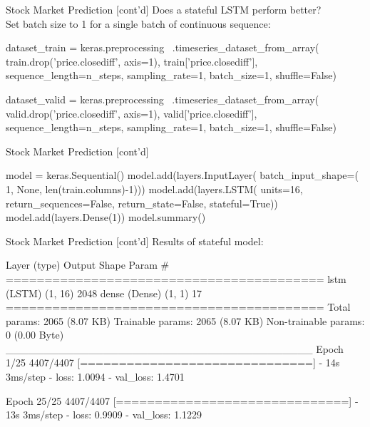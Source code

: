 \documentclass[ignorenonframetext,xcolor=x11names]{beamer}
\begin{document}
\begin{frame}[fragile]{Stock Market Prediction \small [cont'd]}
Does a stateful LSTM perform better? \\

Set batch size to 1 for a single batch of continuous sequence:
\begin{pythoncode}
dataset_train = keras.preprocessing \
    .timeseries_dataset_from_array(
        train.drop('price.closediff', axis=1),
        train['price.closediff'],
        sequence_length=n_steps,
        sampling_rate=1, batch_size=1, shuffle=False)
\end{pythoncode}

\begin{pythoncode}
dataset_valid = keras.preprocessing \
    .timeseries_dataset_from_array(
        valid.drop('price.closediff', axis=1),
        valid['price.closediff'],
        sequence_length=n_steps,
        sampling_rate=1, batch_size=1, shuffle=False)
\end{pythoncode}
\end{frame}

\begin{frame}[fragile]{Stock Market Prediction \small [cont'd]}
\begin{pythoncode}
model = keras.Sequential()
model.add(layers.InputLayer(
    batch_input_shape=(
        1, None, len(train.columns)-1)))
model.add(layers.LSTM(
    units=16,
    return_sequences=False,
    return_state=False,
    stateful=True))
model.add(layers.Dense(1))
model.summary()
\end{pythoncode}
\end{frame}

\begin{frame}[fragile]{Stock Market Prediction \small [cont'd]}
Results of stateful model:

\begin{textcode}
 Layer (type)    Output Shape    Param #   
=========================================
 lstm (LSTM)     (1, 16)         2048      
 dense (Dense)   (1, 1)          17        
=========================================
Total params: 2065 (8.07 KB)
Trainable params: 2065 (8.07 KB)
Non-trainable params: 0 (0.00 Byte)
_________________________________________
Epoch 1/25
4407/4407 [==============================] 
- 14s 3ms/step - loss: 1.0094 - val_loss: 1.4701

Epoch 25/25
4407/4407 [==============================] 
- 13s 3ms/step - loss: 0.9909 - val_loss: 1.1229
\end{textcode}
\end{frame}
\end{document}
